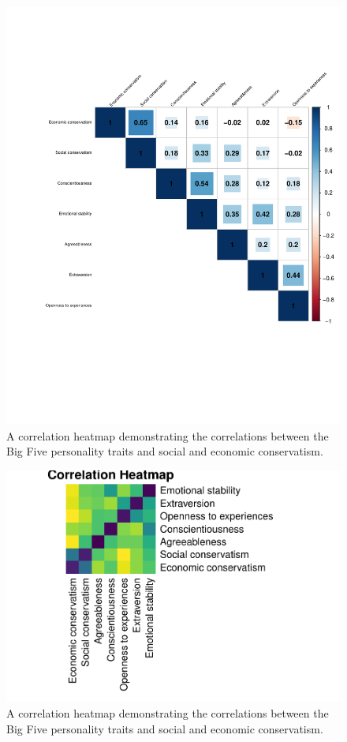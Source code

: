 \documentclass[man]{apa6}
\begin{document}
\begin{figure}
\centering
\includegraphics{manuscript_files/figure-latex/figure1-1.pdf}
\caption{\label{fig:figure1}A correlation heatmap demonstrating the
correlations between the Big Five personality traits and social and
economic conservatism.}
\end{figure}

\begin{figure}
\centering
\includegraphics{manuscript_files/figure-latex/fig1-1.pdf}
\caption{\label{fig:fig1}A correlation heatmap demonstrating the
correlations between the Big Five personality traits and social and
economic conservatism.}
\end{figure}
\end{document}
